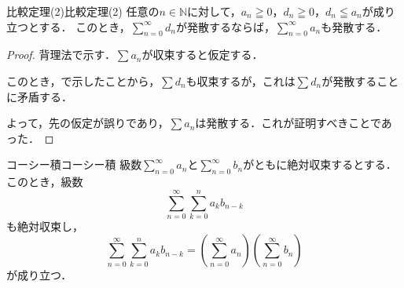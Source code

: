 \begin{theorem}{比較定理(2)}{比較定理(2)}
  任意の$n \in \mathbb{N}$に対して，$a_n \geqq 0$，$d_n \geqq 0$，$d_n \leqq a_n$が成り立つとする．
  このとき，$\sum_{n=0}^{\infty} d_n$が発散するならば，$\sum_{n=0}^{\infty} a_n$も発散する．
\end{theorem}

\begin{tleftbar}
\begin{proof}
  背理法で示す．$\sum a_n$が収束すると仮定する．

  このとき，で示したことから，$\sum d_n$も収束するが，これは$\sum d_n$が発散することに矛盾する．

  よって，先の仮定が誤りであり，$\sum a_n$は発散する．これが証明すべきことであった．
\end{proof}
\end{tleftbar}

\newpage

\begin{theorem}{コーシー積}{コーシー積}
  級数$\sum_{n=0}^{\infty} a_n$と$\sum_{n=0}^{\infty} b_n$がともに絶対収束するとする．
  このとき，級数
  \[
    \sum_{n=0}^{\infty} \sum_{k=0}^{n} a_k b_{n-k}
  \]
  も絶対収束し，
  \[
    \sum_{n=0}^{\infty} \sum_{k=0}^{n} a_k b_{n-k}
    = \left( \sum_{n=0}^{\infty} a_n \right) \left( \sum_{n=0}^{\infty} b_n \right)
  \]
  が成り立つ．
\end{theorem}

